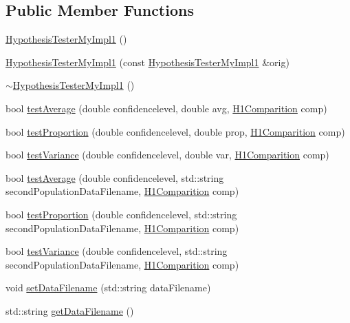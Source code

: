 \subsection*{Public Member Functions}
\begin{DoxyCompactItemize}
\item 
\hyperlink{class_hypothesis_tester_my_impl1_a1bc5f7e6d6a8f823e631b556f97179b9}{Hypothesis\-Tester\-My\-Impl1} ()
\item 
\hyperlink{class_hypothesis_tester_my_impl1_ac077c15369998d214ed4fda9a96ad046}{Hypothesis\-Tester\-My\-Impl1} (const \hyperlink{class_hypothesis_tester_my_impl1}{Hypothesis\-Tester\-My\-Impl1} \&orig)
\item 
\hyperlink{class_hypothesis_tester_my_impl1_a759939644e86036f014dae86e54e7297}{$\sim$\-Hypothesis\-Tester\-My\-Impl1} ()
\item 
bool \hyperlink{class_hypothesis_tester_my_impl1_ae221c4d7e9144d9ecdcb604c778ba0e8}{test\-Average} (double confidencelevel, double avg, \hyperlink{class_hypothesis_tester__if_a89153ff990252f9f79856a2f2532c349}{H1\-Comparition} comp)
\item 
bool \hyperlink{class_hypothesis_tester_my_impl1_a1adf16a900ed4c8b8296a9516877c38b}{test\-Proportion} (double confidencelevel, double prop, \hyperlink{class_hypothesis_tester__if_a89153ff990252f9f79856a2f2532c349}{H1\-Comparition} comp)
\item 
bool \hyperlink{class_hypothesis_tester_my_impl1_a6aca02089c37992e8a6761807a5a127c}{test\-Variance} (double confidencelevel, double var, \hyperlink{class_hypothesis_tester__if_a89153ff990252f9f79856a2f2532c349}{H1\-Comparition} comp)
\item 
bool \hyperlink{class_hypothesis_tester_my_impl1_a0cfde7f4c69ea260350257b0c9c93c37}{test\-Average} (double confidencelevel, std\-::string second\-Population\-Data\-Filename, \hyperlink{class_hypothesis_tester__if_a89153ff990252f9f79856a2f2532c349}{H1\-Comparition} comp)
\item 
bool \hyperlink{class_hypothesis_tester_my_impl1_a13d8ceafa5c23714105f7deae83b5b2e}{test\-Proportion} (double confidencelevel, std\-::string second\-Population\-Data\-Filename, \hyperlink{class_hypothesis_tester__if_a89153ff990252f9f79856a2f2532c349}{H1\-Comparition} comp)
\item 
bool \hyperlink{class_hypothesis_tester_my_impl1_aea5e966244b773179262205369d496d9}{test\-Variance} (double confidencelevel, std\-::string second\-Population\-Data\-Filename, \hyperlink{class_hypothesis_tester__if_a89153ff990252f9f79856a2f2532c349}{H1\-Comparition} comp)
\item 
void \hyperlink{class_hypothesis_tester_my_impl1_a96347967e7fb3ed8760d517b6dea9438}{set\-Data\-Filename} (std\-::string data\-Filename)
\item 
std\-::string \hyperlink{class_hypothesis_tester_my_impl1_a78fc8e7ab09108a7c7698cc3a182b9d7}{get\-Data\-Filename} ()
\end{DoxyCompactItemize}
